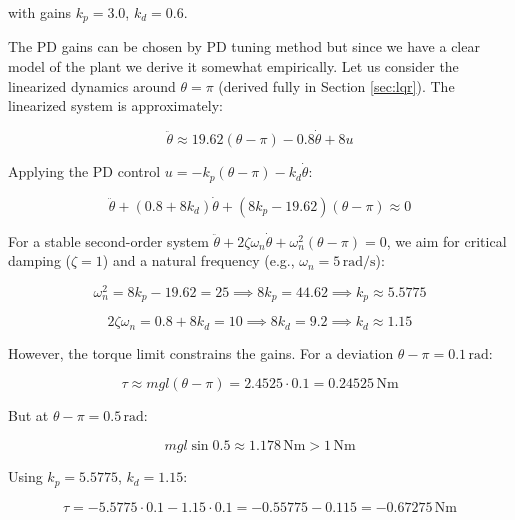 \documentclass[12pt,a4paper]{article}
\begin{document}
with gains \( k_p = 3.0 \), \( k_d = 0.6 \).

The PD gains can be chosen by PD tuning method but since we have a clear model of the plant we derive it somewhat empirically. Let us consider the linearized dynamics around \( \theta = \pi \) (derived fully in Section \ref{sec:lqr}). The linearized system is approximately:

\begin{equation}
\ddot{\theta} \approx 19.62 (\theta - \pi) - 0.8 \dot{\theta} + 8 u
\end{equation}

Applying the PD control \( u = -k_p (\theta - \pi) - k_d \dot{\theta} \):

\begin{equation}
\ddot{\theta} + (0.8 + 8 k_d) \dot{\theta} + (8 k_p - 19.62) (\theta - \pi) \approx 0
\end{equation}

For a stable second-order system \( \ddot{\theta} + 2 \zeta \omega_n \dot{\theta} + \omega_n^2 (\theta - \pi) = 0 \), we aim for critical damping (\( \zeta = 1 \)) and a natural frequency (e.g., \( \omega_n = 5 \, \text{rad/s} \)):

\begin{equation}
\omega_n^2 = 8 k_p - 19.62 = 25 \implies 8 k_p = 44.62 \implies k_p \approx 5.5775
\end{equation}

\begin{equation}
2 \zeta \omega_n = 0.8 + 8 k_d = 10 \implies 8 k_d = 9.2 \implies k_d \approx 1.15
\end{equation}

However, the torque limit constrains the gains. For a deviation \( \theta - \pi = 0.1 \, \text{rad} \):

\begin{equation}
\tau \approx m g l (\theta - \pi) = 2.4525 \cdot 0.1 = 0.24525 \, \text{Nm}
\end{equation}

But at \( \theta - \pi = 0.5 \, \text{rad} \):

\begin{equation}
m g l \sin 0.5 \approx 1.178 \, \text{Nm} > 1 \, \text{Nm}
\end{equation}

Using \( k_p = 5.5775 \), \( k_d = 1.15 \):

\begin{equation}
\tau = -5.5775 \cdot 0.1 - 1.15 \cdot 0.1 = -0.55775 - 0.115 = -0.67275 \, \text{Nm}
\end{equation}
\end{document}

